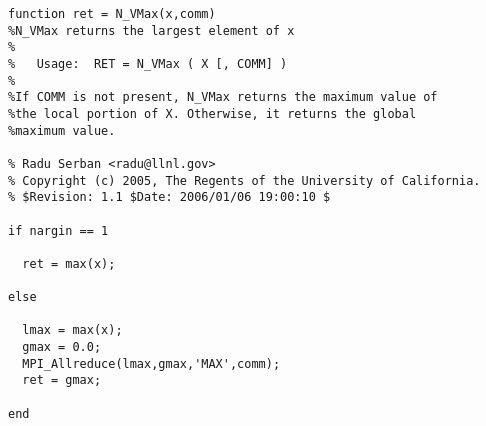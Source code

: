 \begin{lstlisting}[linerange={1-1,9-26}]
function ret = N_VMax(x,comm)
%N_VMax returns the largest element of x
%
%   Usage:  RET = N_VMax ( X [, COMM] )
%
%If COMM is not present, N_VMax returns the maximum value of 
%the local portion of X. Otherwise, it returns the global
%maximum value.

% Radu Serban <radu@llnl.gov>
% Copyright (c) 2005, The Regents of the University of California.
% $Revision: 1.1 $Date: 2006/01/06 19:00:10 $

if nargin == 1
  
  ret = max(x);
  
else
  
  lmax = max(x);
  gmax = 0.0;
  MPI_Allreduce(lmax,gmax,'MAX',comm);
  ret = gmax;
  
end\end{lstlisting}
